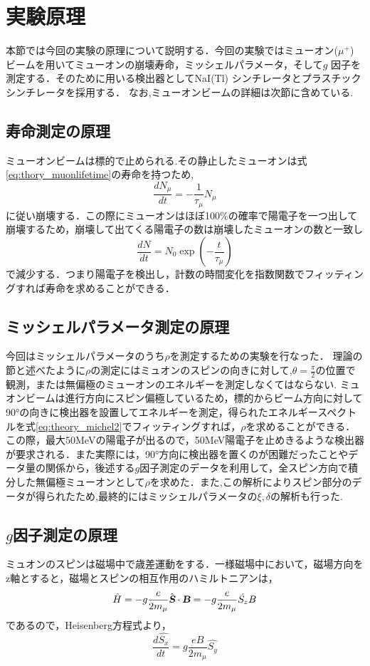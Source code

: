 \section{実験原理}
	本節では今回の実験の原理について説明する．今回の実験ではミューオン($\mu^{+}$) ビームを用いてミューオンの崩壊寿命，ミッシェルパラメータ，そして$g$ 因子を測定する．そのために用いる検出器としてNaI(Tl) シンチレータとプラスチックシンチレータを採用する．
        なお,ミューオンビームの詳細は次節に含めている.
\subsection{寿命測定の原理}
	ミューオンビームは標的で止められる.その静止したミューオンは式\eqref{eq:thory_muonlifetime}の寿命を持つため,
	\begin{equation}
		\frac{dN_\mu}{dt} = -\frac{1}{\tau_\mu} N_{\mu}
	\end{equation}
に従い崩壊する．この際にミューオンはほぼ100\%の確率で陽電子を一つ出して崩壊するため，崩壊して出てくる陽電子の数は崩壊したミューオンの数と一致し
	\begin{equation}
		\frac{dN}{dt} = N_0 \exp{\left(-\frac{t}{\tau_\mu}\right) }
	\end{equation}
で減少する．つまり陽電子を検出し，計数の時間変化を指数関数でフィッティングすれば寿命を求めることができる．
\subsection{ミッシェルパラメータ測定の原理}
	今回はミッシェルパラメータのうち$\rho$を測定するための実験を行なった．
        理論の節と述べたように$\rho$の測定にはミュオンのスピンの向きに対して,$\theta=\frac{\pi}{2}$の位置で観測，または無偏極のミューオンのエネルギーを測定しなくてはならない.
ミュオンビームは進行方向にスピン偏極しているため，標的からビーム方向に対して90°の向きに検出器を設置してエネルギーを測定，得られたエネルギースペクトルを式\eqref{eq:theory_michel2}でフィッティングすれば，$\rho$を求めることができる．この際，最大50MeVの陽電子が出るので，50MeV陽電子を止めきるような検出器が要求される．また実際には，90°方向に検出器を置くのが困難だったことやデータ量の関係から，後述する$g$因子測定のデータを利用して，全スピン方向で積分した無偏極ミューオンとして$\rho$を求めた．また,この解析によりスピン部分のデータが得られたため,最終的にはミッシェルパラメータの$\xi,\delta$の解析も行った.
\subsection{$g$因子測定の原理}
ミュオンのスピンは磁場中で歳差運動をする．一様磁場中において，磁場方向をz軸とすると，磁場とスピンの相互作用のハミルトニアンは，
\begin{equation}
\hat{H} = - g \frac{e}{2m_\mu} \hat {\textsl{\textbf {S}}} \cdot \textsl{\textbf {B}} = - g \frac{e}{2m_\mu}  \hat{S_z} B
\end{equation} 
であるので，Heisenberg方程式より，
\begin{equation}
\frac{d\hat{S_x}}{dt} =  g \frac{eB}{2m_\mu}\hat{S_y} 
\end{equation} 

